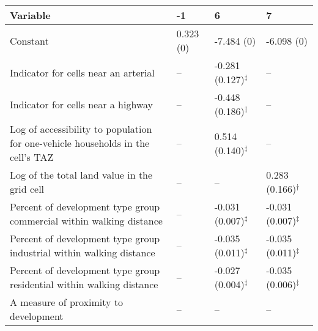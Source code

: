 
\begin{tabular}{p{3in}p{0.5in}p{0.5in}p{0.5in}}
\hline\hline
Variable & -1 & 6 & 7 \\\hline
Constant & 0.323 (0) & -7.484 (0) & -6.098 (0) \\
Indicator for cells near an arterial & -- & -0.281 (0.127)$^{\ddagger}$ & -- \\
Indicator for cells near a highway & -- & -0.448 (0.186)$^{\ddagger}$ & -- \\
Log of accessibility to population for one-vehicle households in the cell's TAZ & -- & 0.514 (0.140)$^{\ddagger}$ & -- \\
Log of the total land value in the grid cell & -- & -- & 0.283 (0.166)$^{\dagger}$ \\
Percent of development type group commercial within walking distance & -- & -0.031 (0.007)$^{\ddagger}$ & -0.031 (0.007)$^{\ddagger}$ \\
Percent of development type group industrial within walking distance & -- & -0.035 (0.011)$^{\ddagger}$ & -0.035 (0.011)$^{\ddagger}$ \\
Percent of development type group residential within walking distance & -- & -0.027 (0.004)$^{\ddagger}$ & -0.035 (0.006)$^{\ddagger}$ \\
A measure of proximity to development & -- & -- & -- \\
\hline\hline
\end{tabular}
